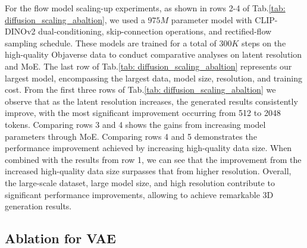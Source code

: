 For the flow model scaling-up experiments, as shown in rows 2-4 of Tab.\ref{tab: diffusion_scaling_abaltion}, we used a $975M$ parameter model with CLIP-DINOv2 dual-conditioning, skip-connection operations, and rectified-flow sampling schedule. These models are trained for a total of $300K$ steps on the high-quality Objaverse data to conduct comparative analyses on latent resolution and MoE. The last row of Tab.\ref{tab: diffusion_scaling_abaltion} represents our largest \method{} model, encompassing the largest data, model size, resolution, and training cost.
From the first three rows of Tab.\ref{tab: diffusion_scaling_abaltion} we observe that as the latent resolution increases, the generated results consistently improve, with the most significant improvement occurring from 512 to 2048 tokens. Comparing rows 3 and 4 shows the gains from increasing model parameters through MoE. 
Comparing rows 4 and 5 demonstrates the performance improvement achieved by increasing high-quality data size. When combined with the results from row 1, we can see that the improvement from the increased high-quality data size surpasses that from higher resolution.
Overall, the large-scale dataset, large model size, and high resolution contribute to significant performance improvements, allowing \method{} to achieve remarkable 3D generation results.


\subsection{Ablation for VAE}

